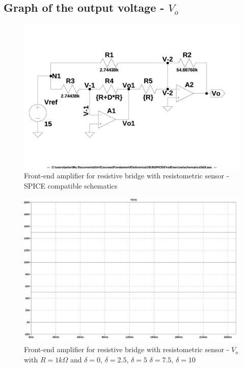 \documentclass[10pt,a4paper]{article}
\begin{document}
\subsection{Graph of the output voltage - $V_o$}

\begin{figure}[H]
  \centering
  \includegraphics[width=12cm]{schematics/3d3.jpg}
  \caption{Front-end amplifier for resistive bridge with resistometric sensor - SPICE compatible schematics}
  \label{3d3schematics}
\end{figure}



\begin{figure}[H]
  \centering
  \includegraphics[width=14cm]{graph/3d3.jpg}
  \caption{Front-end amplifier for resistive bridge with resistometric sensor - $V_o$ with $R = 1k\Omega$ and $\delta = 0$, $\delta = 2.5$, $\delta = 5$ $\delta = 7.5$, $\delta = 10$}
  \label{3d3graph}
\end{figure}
\end{document}
